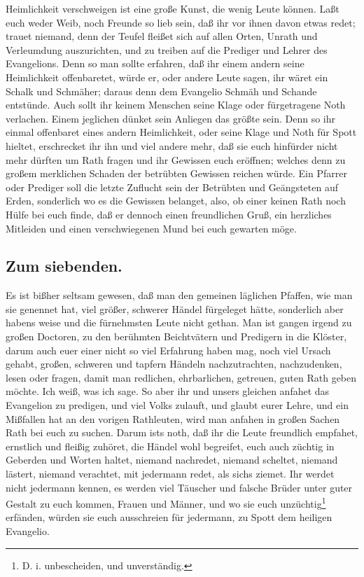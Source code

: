 Heimlichkeit verschweigen ist eine große Kunst, die wenig Leute können. Laßt euch weder Weib, noch Freunde so lieb sein, daß ihr vor ihnen davon etwas redet; trauet niemand, denn der Teufel fleißet sich auf allen Orten, Unrath und Verleumdung auszurichten, und zu treiben auf die Prediger und Lehrer des Evangelions. Denn so man sollte erfahren, daß ihr einem andern seine Heimlichkeit offenbaretet, würde er, oder andere Leute sagen, ihr wäret ein Schalk und Schmäher; daraus denn dem Evangelio Schmäh und Schande entstünde. Auch sollt ihr keinem Menschen seine Klage oder fürgetragene Noth verlachen. Einem jeglichen dünket sein Anliegen das größte sein. Denn so ihr einmal offenbaret eines andern Heimlichkeit, oder seine Klage und Noth für Spott hieltet, erschrecket ihr ihn und viel andere mehr, daß sie euch hinfürder nicht mehr dürften um Rath fragen und ihr
Gewissen euch eröffnen; welches denn zu großem merklichen Schaden der betrübten Gewissen reichen würde. Ein Pfarrer oder Prediger soll die letzte Zuflucht sein der Betrübten und Geängsteten auf Erden, sonderlich wo es die Gewissen belanget, also, ob einer keinen Rath noch Hülfe bei euch finde, daß er dennoch einen freundlichen Gruß, ein herzliches Mitleiden und einen verschwiegenen Mund bei euch gewarten möge.

\subsection*{Zum siebenden.}

Es ist bißher seltsam gewesen, daß man den gemeinen läglichen Pfaffen, wie man sie genennet hat, viel größer, schwerer Händel fürgeleget hätte, sonderlich aber habens weise und die fürnehmsten Leute nicht gethan. Man ist gangen irgend zu großen Doctoren, zu den berühmten Beichtvätern und Predigern in die Klöster, darum auch euer einer nicht so viel Erfahrung haben mag, noch viel Ursach gehabt, großen, schweren und tapfern Händeln nachzutrachten, nachzudenken, lesen oder fragen, damit man redlichen, ehrbarlichen, getreuen, guten Rath geben möchte. Ich weiß, was ich sage. So aber ihr und unsers gleichen anfahet das Evangelion zu predigen, und viel Volks zulauft, und glaubt eurer Lehre, und ein Mißfallen hat an den vorigen Rathleuten, wird man anfahen in großen Sachen Rath bei euch zu suchen. Darum ists noth, daß ihr die Leute freundlich empfahet, ernstlich und fleißig zuhöret, die Händel wohl begreifet, euch auch züchtig in Geberden und Worten haltet, niemand nachredet, niemand scheltet, niemand lästert, niemand verachtet, mit jedermann redet, als sichs ziemet. Ihr werdet nicht jedermann kennen, es werden viel Täuscher und falsche Brüder unter guter Gestalt zu euch kommen, Frauen und Männer, und wo sie euch unzüchtig\footnote{D. i. unbescheiden, und unverständig.} erfänden, würden sie euch ausschreien für jedermann, zu Spott dem heiligen Evangelio.

